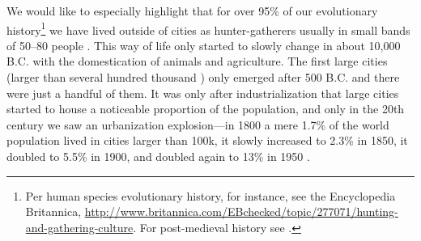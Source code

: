 \documentclass[10pt, letterpaper]{article}
\begin{document}
We would like to especially highlight that for over 95\% of our evolutionary history\footnote{%
Per human species evolutionary history, for instance, see the  Encyclopedia Britannica, \url{http://www.britannica.com/EBchecked/topic/277071/hunting-and-gathering-culture}. 
   For post-medieval history see \citet{white77}.%
 } we have lived outside of cities as hunter-gatherers usually in small bands of 50--80 people \citep{maryanski92}.
 This way of life only started to slowly change in about 10,000 B.C.  with the domestication of animals
 and agriculture. The first large cities (larger than several hundred thousand%
 ) only emerged after 500 B.C. and there were just a handful of them. 
 It was only after industrialization that large cities started to house a noticeable proportion of the population, and only in the 20th century we saw an urbanization explosion---in 1800 a mere 1.7\% of the world population lived in cities larger than 100k, it slowly increased to 2.3\% in 1850,  it doubled to 5.5\% in 1900,
 and  doubled again to 13\% in 1950 \citep{davis55}.
\end{document}
